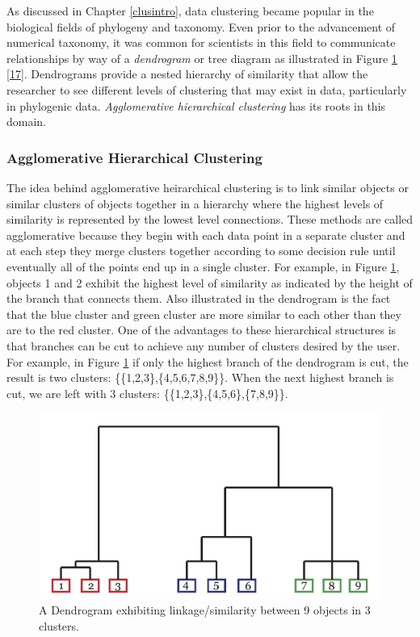 \documentclass[
]{article}
\theoremstyle{definition}
\theoremstyle{definition}
\theoremstyle{definition}
\theoremstyle{definition}
\theoremstyle{remark}
\begin{document}
As discussed in Chapter \ref{clusintro}, data clustering became popular in the biological fields of phylogeny and taxonomy. Even prior to the advancement of numerical taxonomy, it was common for scientists in this field to communicate relationships by way of a \emph{dendrogram} or tree diagram as illustrated in Figure \ref{fig:dendrogram} \protect\hyperlink{ref-sokal}{{[}17{]}}. Dendrograms provide a nested hierarchy of similarity that allow the researcher to see different levels of clustering that may exist in data, particularly in phylogenic data. \emph{Agglomerative hierarchical clustering} has its roots in this domain.

\hypertarget{agglomerative-hierarchical-clustering}{%
\subsubsection{Agglomerative Hierarchical Clustering}\label{agglomerative-hierarchical-clustering}}

The idea behind agglomerative heirarchical clustering is to link similar objects or similar clusters of objects together in a hierarchy where the highest levels of similarity is represented by the lowest level connections. These methods are called agglomerative because they begin with each data point in a separate cluster and at each step they merge clusters together according to some decision rule until eventually all of the points end up in a single cluster. For example, in Figure \ref{fig:dendrogram}, objects 1 and 2 exhibit the highest level of similarity as indicated by the height of the branch that connects them. Also illustrated in the dendrogram is the fact that the blue cluster and green cluster are more similar to each other than they are to the red cluster. One of the advantages to these hierarchical structures is that branches can be cut to achieve any number of clusters desired by the user. For example, in Figure \ref{fig:dendrogram} if only the highest branch of the dendrogram is cut, the result is two clusters: \{\{1,2,3\},\{4,5,6,7,8,9\}\}. When the next highest branch is cut, we are left with 3 clusters: \{\{1,2,3\},\{4,5,6\},\{7,8,9\}\}.

\begin{figure}

{\centering \includegraphics[width=0.75\linewidth]{figs/dendrogram} 

}

\caption{A Dendrogram exhibiting linkage/similarity between 9 objects in 3 clusters.}\label{fig:dendrogram}
\end{figure}
\end{document}

